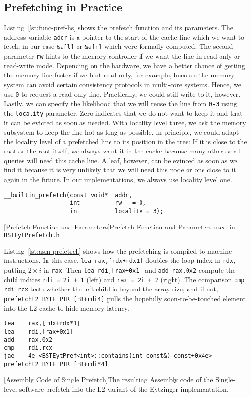 \documentclass{article}
\begin{document}
\subsection{Prefetching in Practice}
Listing~\ref{lst:func-pref-hs} shows the prefetch function and its parameters. The address variable \texttt{addr} is a pointer to the start of the cache line which we want to fetch, in our case \texttt{\&a[l]} or \texttt{\&a[r]} which were formally computed. The second parameter \texttt{rw} hints to the memory controller if we want the line in read-only or read-write mode. Depending on the hardware, we have a better chance of getting the memory line faster if we hint read-only, for example, because the memory system can avoid certain consistency protocols in multi-core systems. Hence, we use \texttt{0} to request a read-only line. Practically, we could still write to it, however. Lastly, we can specify the likelihood that we will reuse the line from \texttt{0-3} using the \texttt{locality} parameter. Zero indicates that we do not want to keep it and that it can be evicted as soon as needed. With locality level three, we ask the memory subsystem to keep the line hot as long as possible. In principle, we could adapt the locality level of a prefetched line to its position in the tree: If it is close to the root or the root itself, we always want it in the cache because many other or all queries will need this cache line. A leaf, however, can be evinced as soon as we find it because it is very unlikely that we will need this node or one close to it again in the future. In our implementations, we always use locality level one.


\begin{lstlisting}
__builtin_prefetch(const void*  addr,
                   int          rw   = 0,
                   int          locality = 3);
\end{lstlisting}
[Prefetch Function and Parameters]{Prefetch Function and Parameters used in \texttt{BSTEytPrefetch.h}}
\label{lst:func-pref-hs}

Listing~\ref{lst:asm-prefetrch} shows how the prefetching is compiled to machine instructions. In this case, \texttt{lea rax,[rdx+rdx1]} doubles the loop index in \texttt{rdx}, putting $2 \times i$ in \texttt{rax}. Then \texttt{lea rdi,[rax+0x1]} and \texttt{add rax,0x2} compute the child indices \texttt{rdi = 2i + 1} (left) and \texttt{rax = 2i + 2} (right). The comparison \texttt{cmp rdi,rcx} tests whether the left child is beyond the array size, and if not, \texttt{prefetcht2 BYTE PTR [r8+rdi4]} pulls the hopefully soon-to-be-touched element into the L2 cache to hide memory latency.
\begin{lstlisting}
lea    rax,[rdx+rdx*1]
lea    rdi,[rax+0x1]
add    rax,0x2
cmp    rdi,rcx
jae    4e <BSTEytPref<int>::contains(int const&) const+0x4e>
prefetcht2 BYTE PTR [r8+rdi*4]
\end{lstlisting}
[Assembly Code of Single Prefetch]{The resulting Assembly code of the Single-level software
prefetch into the L2 variant of the Eytzinger implementation.}
\label{lst:asm-prefetrch}
\end{document}
